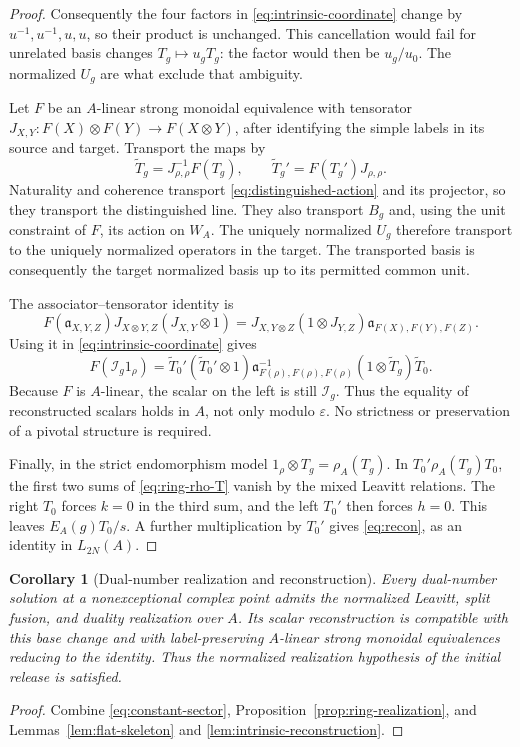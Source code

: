 \documentclass[11pt]{article}
\newtheorem{corollary}[theorem]{Corollary}
\theoremstyle{remark}
\newcommand{\eps}{\varepsilon}
\begin{document}
\begin{proof}
Consequently the four factors in \eqref{eq:intrinsic-coordinate} change
by $u^{-1},u^{-1},u,u$, so their product is unchanged. This cancellation
would fail for unrelated basis changes $T_g\mapsto u_gT_g$: the factor
would then be $u_g/u_0$. The normalized $U_g$ are what exclude that
ambiguity.

Let $F$ be an $A$-linear strong monoidal equivalence with tensorator
$J_{X,Y}:F(X)\otimes F(Y)\to F(X\otimes Y)$, after identifying the simple
labels in its source and target. Transport the maps by
\[
 \widetilde T_g=J_{\rho,\rho}^{-1}F(T_g),\qquad
 \widetilde T_g'=F(T_g')J_{\rho,\rho}.
\]
Naturality and coherence transport \eqref{eq:distinguished-action} and
its projector, so they transport the distinguished line. They also
transport $B_g$ and, using the unit constraint of $F$, its action on
$W_A$. The uniquely normalized $U_g$ therefore transport to the uniquely
normalized operators in the target. The transported basis is consequently
the target normalized basis up to its permitted common unit.

The associator--tensorator identity is
\[
 F(\mathfrak a_{X,Y,Z})J_{X\otimes Y,Z}(J_{X,Y}\otimes1)
 =J_{X,Y\otimes Z}(1\otimes J_{Y,Z})
                  \mathfrak a_{F(X),F(Y),F(Z)}.
\]
Using it in \eqref{eq:intrinsic-coordinate} gives
\[
 F(\mathcal I_g1_\rho)=
 \widetilde T_0'(\widetilde T_0'\otimes1)
 \mathfrak a_{F(\rho),F(\rho),F(\rho)}^{-1}
 (1\otimes\widetilde T_g)\widetilde T_0.
\]
Because $F$ is $A$-linear, the scalar on the left is still $\mathcal I_g$.
Thus the equality of reconstructed scalars holds in $A$, not only modulo
$\eps$. No strictness or preservation of a pivotal structure is required.

Finally, in the strict endomorphism model $1_\rho\otimes T_g=\rho_A(T_g)$.
In $T_0'\rho_A(T_g)T_0$, the first two sums of
\eqref{eq:ring-rho-T} vanish by the mixed Leavitt relations. The right
$T_0$ forces $k=0$ in the third sum, and the left $T_0'$ then forces
$h=0$. This leaves $E_A(g)T_0/s$. A further multiplication by $T_0'$
gives \eqref{eq:recon}, as an identity in $L_{2N}(A)$.
\end{proof}

\begin{corollary}[Dual-number realization and reconstruction]
\label{cor:dual-realization}
Every dual-number solution at a nonexceptional complex point admits the
normalized Leavitt, split fusion, and duality realization over $A$.
Its scalar reconstruction is compatible with this base change and with
label-preserving $A$-linear strong monoidal equivalences reducing to the
identity. Thus the normalized realization hypothesis of the initial
release is satisfied.
\end{corollary}
\begin{proof}
Combine \eqref{eq:constant-sector}, Proposition~\ref{prop:ring-realization},
and Lemmas~\ref{lem:flat-skeleton} and \ref{lem:intrinsic-reconstruction}.
\end{proof}
\end{document}
